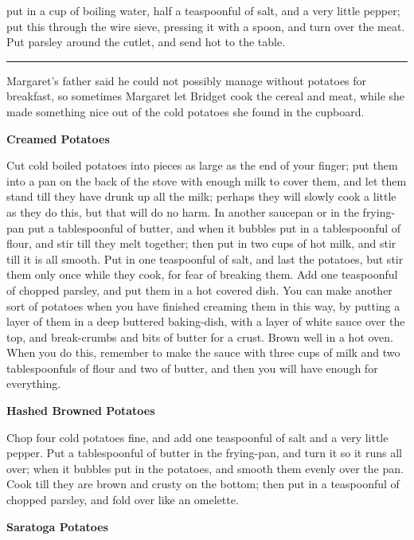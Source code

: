 \documentclass[11pt]{book}
\newcommand{\hstroke}{\rule[0.5ex]{5.0em}{0.2ex}}
\newcommand{\indpar}{\par\noindent\hspace*{\parindent}}
\newcommand{\instruction}{\indpar}
\newenvironment{RecipeTitle}{\medskip\begin{center}\large\bf }{\end{center}\smallskip}
\begin{document}
put in a cup of boiling water, half a teaspoonful of salt, and a
very little pepper; put this through the wire sieve, pressing it
with a spoon, and turn over the meat.  Put parsley around the cutlet,
and send hot to the table.
\bigskip
\begin{center}
\hstroke
\end{center}
\medskip
\indpar
  Margaret's father said he could not possibly manage without
potatoes for breakfast, so sometimes Margaret let Bridget cook
the cereal and meat, while she made something nice out of the
cold potatoes she found in the cupboard.
\begin{RecipeTitle}
Creamed Potatoes\label{creamed_potatoes}
\end{RecipeTitle}
\instruction
  Cut cold boiled potatoes into pieces as large as the end of your
finger; put them into a pan on the back of the stove with enough milk
to cover them, and let them stand till they have drunk up all the
milk; perhaps they will slowly cook a little as they do this, but
that will do no harm.  In another saucepan or in the frying-pan
put a tablespoonful of butter, and when it bubbles put in a
tablespoonful of flour, and stir till they melt together; then
put in two cups of hot milk, and stir till it is all smooth.  Put
in one teaspoonful of salt, and last the potatoes, but stir them
only once while they cook, for fear of breaking them.  Add one
teaspoonful of chopped parsley, and put them in a hot covered dish.
You can make another sort of potatoes when you have finished
creaming them in this way, by putting a layer of them in a deep
buttered baking-dish, with a layer of white sauce over the top,
and break-crumbs and bits of butter for a crust.  Brown well in a
hot oven.  When you do this, remember to make the sauce with three
cups of milk and two tablespoonfuls of flour and two of butter,
and then you will have enough for everything.
\begin{RecipeTitle}
Hashed Browned Potatoes\label{hashed_browned_potatoes}
\end{RecipeTitle}
\instruction
  Chop four cold potatoes fine, and add one teaspoonful of salt
and a very little pepper.  Put a tablespoonful of butter in the
frying-pan, and turn it so it runs all over;  when it bubbles
put in the potatoes, and smooth them evenly over the pan.  Cook
till they are brown and crusty on the bottom; then put in a
teaspoonful of chopped parsley, and fold over like an omelette.
\begin{RecipeTitle}
Saratoga Potatoes\label{saratoga_potatoes}
\end{RecipeTitle}
\end{document}
